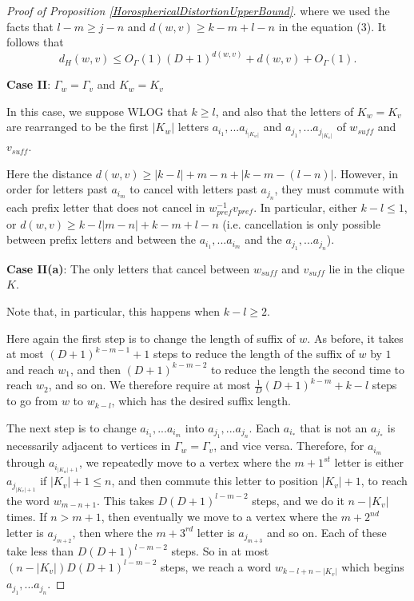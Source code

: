 \documentclass{amsart}
\theoremstyle{definition}
\theoremstyle{remark}
\begin{document}
\begin{proof} [Proof of Proposition \ref{HorosphericalDistortionUpperBound}]
		where we used the facts that $l-m\ge j-n$ and $d(w,v)\ge k-m+l-n$ in the equation (3). It follows that $$d_H(w,v)\le O_\Gamma(1)(D+1)^{d(w,v)}+d(w,v)+O_\Gamma(1).$$
		
		\textbf{Case II}: $\Gamma_w=\Gamma_v$ and $K_w=K_v$
		
		In this case, we suppose WLOG that $k\ge l$, and also that the letters of $K_w=K_v$ are rearranged to be the first $|K_w|$ letters $a_{i_1}, ... a_{i_{|K_w|}}$ and $a_{j_1}, ... a_{j_{|K_v|}}$ of $w_{suff}$ and $v_{suff}$.
		
		Here the distance $d(w,v) \ge |k-l|+m-n+|k-m-(l-n)|$. However, in order for letters past $a_{i_m}$ to cancel with letters past $a_{j_n}$, they must commute with each prefix letter that does not cancel in $w_{pref}^{-1}v_{pref}$. In particular, either $k-l\le 1$, or $d(w,v) \ge k-l |m-n|+k-m+l-n$ (i.e. cancellation is only possible between prefix letters and between the $a_{i_1}, ... a_{i_m}$ and the $a_{j_1}, ... a_{j_n}$).
		
		\textbf{Case II(a)}: The only letters that cancel between $w_{suff}$ and $v_{suff}$ lie in the clique $K$.
		
		Note that, in particular, this happens when $k-l\ge 2$.
		
		Here again the first step is to change the length of suffix of $w$. As before, it takes at most \newline $(D+1)^{k-m-1}+1$ steps to reduce the length of the suffix of $w$ by $1$ and reach $w_1$, and then $(D+1)^{k-m-2}$ to reduce the length the second time to reach $w_2$, and so on. We therefore require at most $\frac{1}{D}(D+1)^{k-m}+k-l$ steps to go from $w$ to $w_{k-l}$, which has the desired suffix length.
		
		The next step is to change $a_{i_1}, ... a_{i_m}$ into $a_{j_1}, ... a_{j_n}$. Each $a_{i_*}$ that is not an $a_{j_*}$ is necessarily adjacent to vertices in $\Gamma_w=\Gamma_v$, and vice versa. Therefore, for $a_{i_m}$ through $a_{i_{|K_w|+1}}$, we repeatedly move to a vertex where the $m+1^{st}$ letter is either $a_{j_{|K_v|+1}}$ if $|K_v|+1\le n$, and then commute this letter to position $|K_v|+1$, to reach the word $w_{m-n+1}$. This takes $D(D+1)^{l-m-2}$ steps, and we do it $n-|K_v|$ times. If $n>m+1$, then eventually we move to a vertex where the $m+2^{nd}$ letter is $a_{j_{m+2}}$, then where the $m+3^{rd}$ letter is $a_{j_{m+3}}$ and so on. Each of these take less than $D(D+1)^{l-m-2}$ steps. So in at most $(n-|K_v|)D(D+1)^{l-m-2}$ steps, we reach a word $w_{k-l+n-|K_v|}$ which begins $a_{j_1}, ... a_{j_n}$.
		

\end{proof}
\end{document}
